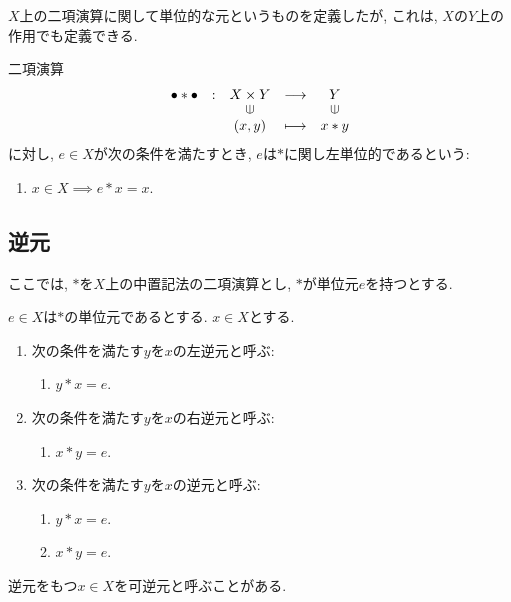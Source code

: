 $X$上の二項演算に関して単位的な元というものを定義したが,
これは, $X$の$Y$上の作用でも定義できる.
\begin{definition}
  二項演算
  \begin{align*}
    \shazo{\bullet\ast\bullet}
          {X\times Y}{Y}
          {(x,y)}{x\ast y}
  \end{align*}
  に対し,
  $e\in X$が次の条件を満たすとき,
  $e$は$\ast$に関し左単位的であるという:
  \begin{enumerate}
  \item $x\in X\implies e\ast x=x$.
  \end{enumerate}
\end{definition}

\subsection{逆元}
ここでは, $\ast$を$X$上の中置記法の二項演算とし,
$\ast$が単位元$e$を持つとする.
\begin{definition}
  $e\in X$は$\ast$の単位元であるとする.
  $x\in X$とする.
  \begin{enumerate}
  \item 次の条件を満たす$y$を$x$の左逆元と呼ぶ:
    \begin{enumerate}
      \item $y\ast x=e$.
    \end{enumerate}
  \item 次の条件を満たす$y$を$x$の右逆元と呼ぶ:
    \begin{enumerate}
      \item $x\ast y=e$.
    \end{enumerate}
  \item 次の条件を満たす$y$を$x$の逆元と呼ぶ:
    \begin{enumerate}
      \item $y\ast x=e$.
    \item $x\ast y=e$.
    \end{enumerate}  
  \end{enumerate}
  逆元をもつ$x\in X$を可逆元と呼ぶことがある.
\end{definition}

